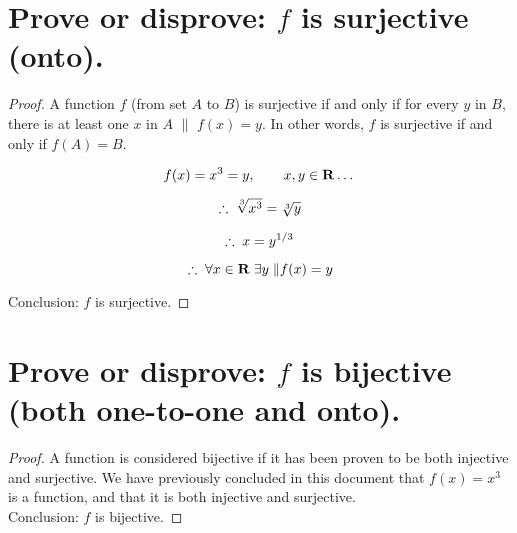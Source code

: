 \documentclass{article}
\begin{document}
\section{Prove or disprove: $f$ is surjective (onto).}
\begin{proof}

A function $f$ (from set $A$ to $B$) is surjective if and only if for every $y$ in $B$, there is at least one $x$ in 
$A$ $\|$ $f(x) = y$. In other words, $f$ is surjective if and only if $f(A) = B$. 

\begin{equation}
f(x) = x^3 = y , \qquad x , y \in \mathbf{R} \ldots \\
\end{equation}

\begin{equation}
\therefore \;
\sqrt[3]{x^3} = \sqrt[3]{y}\qquad \\
\end{equation}

\begin{equation}
\therefore \; 
x = y^{1/3} \\
\end{equation}

\begin{equation}
\therefore \; \forall x \in \mathbf{R} \; \exists y \; \| f(x) = y  \\
\end{equation}

Conclusion: $f$ is surjective.

\end{proof}

\section{Prove or disprove: $f$ is bijective (both one-to-one and onto).}
\begin{proof}

A function is considered bijective if it has been proven to be both injective and surjective. We have previously 
concluded in this document that $f(x) = x^3$ is a function, and that it is both injective and surjective. \\

Conclusion: $f$ is bijective.
\end{proof}
\end{document}
